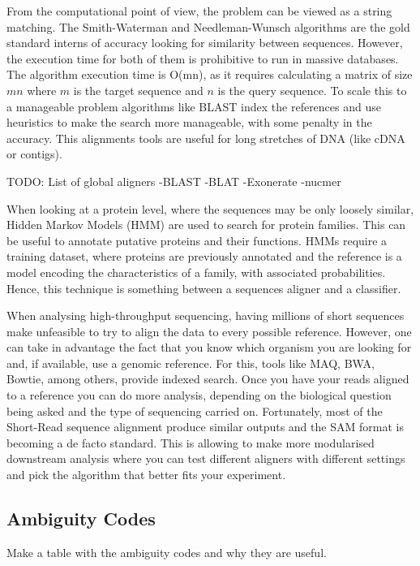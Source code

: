 From the computational point of view, the problem can be viewed as a string matching. The Smith-Waterman\cite{Smith1981} and Needleman-Wunsch\cite{Needleman1970} algorithms are the gold standard interns of accuracy looking for similarity between sequences. However, the execution time for both of them is prohibitive to run in massive databases. The algorithm execution time is O(mn), as it requires calculating a matrix of size $mn$ where $m$ is the target sequence and $n$ is the query sequence.  To scale this to a manageable problem algorithms like BLAST index the references and use heuristics to make the search more manageable, with some penalty in the accuracy. This alignments tools are useful for long stretches of DNA (like cDNA or contigs)\cite{Altschul1990}.

TODO: List of global aligners
-BLAST
-BLAT
-Exonerate
-nucmer


When looking at a protein level, where the sequences may be only loosely similar, Hidden Markov Models (HMM) are used to search for protein families. This can be useful to annotate putative proteins and their functions. HMMs require a training dataset, where proteins are previously annotated and the reference is a model encoding the characteristics of a family, with associated probabilities. Hence, this technique is something between a sequences aligner and a classifier\cite{Eddy2004}. 

When analysing high-throughput sequencing, having millions of short sequences make unfeasible to try to align the data to every possible reference. However, one can take in advantage the fact that you know which organism you are looking for and, if available, use a genomic reference. For this, tools like MAQ, BWA, Bowtie, among others, provide indexed search.  Once you have your reads aligned to a reference you can do more analysis, depending on the biological question being asked and the type of sequencing carried on.  Fortunately, most of the Short-Read sequence alignment produce similar outputs and the SAM format is becoming a de facto standard. This is allowing to make more modularised downstream analysis where you can test different aligners with different settings and pick the algorithm that better fits your experiment\cite{Liu2012,Li2009,Li2009a}. 

\subsection{Ambiguity Codes}
\label{lit:ambiguity}
Make a table with the ambiguity codes and why they are useful. 




